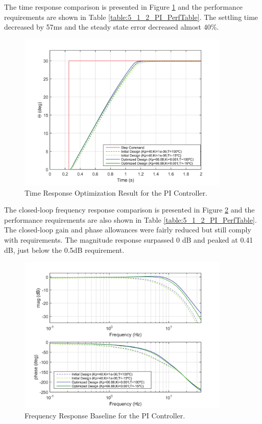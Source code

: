 The time response comparison is presented in Figure \ref{fig:5_1_2_PI_TimeResp} and the performance requirements are shown in Table \ref{table:5_1_2_PI_PerfTable}. The settling time decreased by 57ms and the steady state error decreased almost 40\%.

\begin{figure}[H]
	\centering
	\centerline{\includegraphics[width=0.9\textwidth]{Figuras/5.OptimizationResults/5-1-2-PI-TimeResponseComparison.jpg}}
	\caption{Time Response Optimization Result for the PI Controller.}
	\label{fig:5_1_2_PI_TimeResp}
\end{figure}

The closed-loop frequency response comparison is presented in Figure \ref{fig:5_1_2_PI_FreqResp} and the performance requirements are also shown in Table \ref{table:5_1_2_PI_PerfTable}. The closed-loop gain and phase allowances were fairly reduced but still comply with requirements. The magnitude response surpassed 0 dB and peaked at 0.41 dB, just below the 0.5dB requirement.

\begin{figure}[H]
	\centering
	\centerline{\includegraphics[width=0.9\textwidth]{Figuras/5.OptimizationResults/5-1-2-PI-FrequencyResponseComparison.jpg}}
	\caption{Frequency Response Baseline for the PI Controller.}
	\label{fig:5_1_2_PI_FreqResp}
\end{figure}

